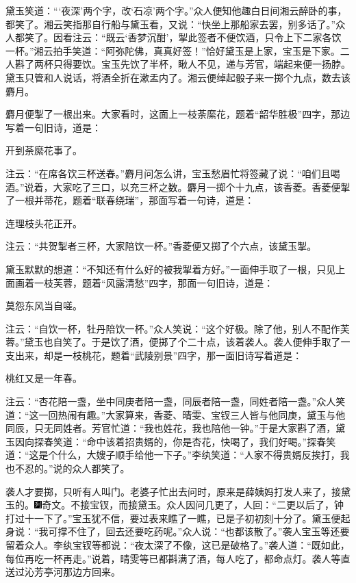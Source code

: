 黛玉笑道：“‘夜深’两个字，改‘石凉’两个字。”众人便知他趣白日间湘云醉卧的事，都笑了。湘云笑指那自行船与黛玉看，又说：“快坐上那船家去罢，别多话了。”众人都笑了。因看注云：“既云‘香梦沉酣’，掣此签者不便饮酒，只令上下二家各饮一杯。”湘云拍手笑道：“阿弥陀佛，真真好签！”恰好黛玉是上家，宝玉是下家。二人斟了两杯只得要饮。宝玉先饮了半杯，瞅人不见，递与芳官，端起来便一扬脖。黛玉只管和人说话，将酒全折在漱盂内了。湘云便绰起骰子来一掷个九点，数去该麝月。

麝月便掣了一根出来。大家看时，这面上一枝荼縻花，题着“韶华胜极”四字，那边写着一句旧诗，道是：

开到荼縻花事了。

注云：“在席各饮三杯送春。”麝月问怎么讲，宝玉愁眉忙将签藏了说：“咱们且喝酒。”说着，大家吃了三口，以充三杯之数。麝月一掷个十九点，该香菱。香菱便掣了一根并蒂花，题着“联春绕瑞”，那面写着一句诗，道是：

连理枝头花正开。

注云：“共贺掣者三杯，大家陪饮一杯。”香菱便又掷了个六点，该黛玉掣。

黛玉默默的想道：“不知还有什么好的被我掣着方好。”一面伸手取了一根，只见上面画着一枝芙蓉，题着“风露清愁”四字，那面一句旧诗，道是：

莫怨东风当自嗟。

注云：“自饮一杯，牡丹陪饮一杯。”众人笑说：“这个好极。除了他，别人不配作芙蓉。”黛玉也自笑了。于是饮了酒，便掷了个二十点，该着袭人。袭人便伸手取了一支出来，却是一枝桃花，题着“武陵别景”四字，那一面旧诗写着道是：

桃红又是一年春。

注云：“杏花陪一盏，坐中同庚者陪一盏，同辰者陪一盏，同姓者陪一盏。”众人笑道：“这一回热闹有趣。”大家算来，香菱、晴雯、宝钗三人皆与他同庚，黛玉与他同辰，只无同姓者。芳官忙道：“我也姓花，我也陪他一钟。”于是大家斟了酒，黛玉因向探春笑道：“命中该着招贵婿的，你是杏花，快喝了，我们好喝。”探春笑道：“这是个什么，大嫂子顺手给他一下子。”李纨笑道：“人家不得贵婿反挨打，我也不忍的。”说的众人都笑了。

袭人才要掷，只听有人叫门。老婆子忙出去问时，原来是薛姨妈打发人来了，接黛玉的。{\includegraphics[width=3mm]{../Images/00007}奇文。不接宝钗，而接黛玉。}众人因问几更了，人回：“二更以后了，钟打过十一下了。”宝玉犹不信，要过表来瞧了一瞧，已是子初初刻十分了。黛玉便起身说：“我可撑不住了，回去还要吃药呢。”众人说：“也都该散了。”袭人宝玉等还要留着众人。李纨宝钗等都说：“夜太深了不像，这已是破格了。”袭人道：“既如此，每位再吃一杯再走。”说着，晴雯等已都斟满了酒，每人吃了，都命点灯。袭人等直送过沁芳亭河那边方回来。


